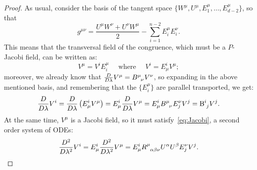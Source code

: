 	\begin{proof}
		As usual, consider the basis of the tangent space \(\{W^{\mu}, U^{\mu}, E_1^{\mu}, \ldots, E_{d - 2}^{\mu}\}\), so that
		\[
		g^{\mu\nu} = \frac{U^{\mu}W^{\nu} + U^{\nu}W^{\mu}}{2} - \sum_{i=1}^{n - 2}E_i^{\mu}E_i^{\nu}.
		\]
		This means that the transversal field of the congruence, which must be a \(P\)-Jacobi field, can be written as:
		\[
		V^{\mu} = V^iE_i^{\mu} \quad \text{ where } \quad V^i = E^i_{\mu}V^{\mu};
		\]
		moreover, we already know that \(\frac{D}{D\lambda}V^{\mu} = B\indices{^{\mu}_{\nu}}V^{\nu}\), so expanding in the above mentioned basis, and remembering that the \(\{E_i^{\mu}\}\) are parallel transported, we get:
		\begin{equation}
		\label{eq:1st-order-V_i}
			\frac{D}{D\lambda}V^i = \frac{D}{D\lambda}\left(E^i_{\mu}V^{\mu}\right) = E^i_{\mu}\frac{D}{D\lambda}V^{\mu} = E^i_{\mu}B\indices{^{\mu}_{\nu}}E_j^{\nu}V^j = \mathrm{B}\indices{^i_j}V^j.
		\end{equation}
		At the same time, \(V^{\mu}\) is a Jacobi field, so it must satisfy~\eqref{eq:Jacobi}, a second order system of ODEs:
		\begin{equation}
			\label{eq:Jacobi-E_i}
			\frac{D^2}{D\lambda^2}V^i = E^i_{\mu}\frac{D^2}{D\lambda^2}V^{\mu} = E^i_{\mu}R\indices{^{\mu}_{\alpha\beta\nu}}U^{\alpha}U^{\beta}E_j^{\nu}V^j.
		\end{equation}
		

\end{proof}
